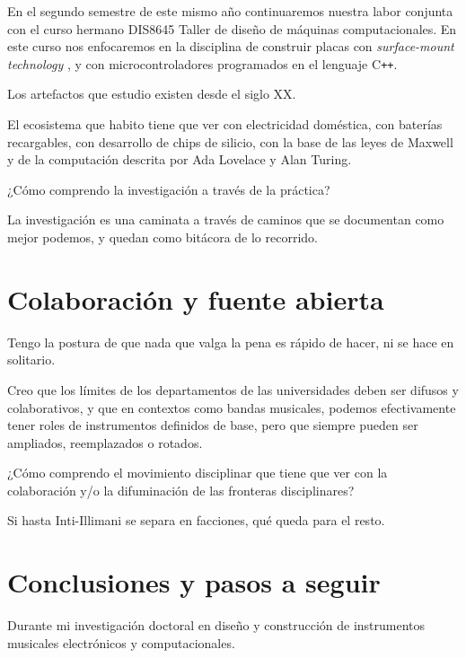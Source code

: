 \documentclass{article}
\begin{document}
En el segundo semestre de este mismo año continuaremos nuestra labor conjunta con el curso hermano DIS8645 Taller de diseño de máquinas computacionales. En este curso nos enfocaremos en la disciplina de construir placas con \textit{surface-mount technology} \cite{smt}, y con microcontroladores programados en el lenguaje C\texttt{++}.

Los artefactos que estudio existen desde el siglo XX.

El ecosistema que habito tiene que ver con electricidad doméstica, con baterías recargables, con desarrollo de chips de silicio, con la base de las leyes de Maxwell y de la computación descrita por Ada Lovelace y Alan Turing.

¿Cómo comprendo la investigación a través de la práctica?

La investigación es una caminata a través de caminos que se documentan como mejor podemos, y quedan como bitácora de lo recorrido.

\clearpage

\section{Colaboración y fuente abierta}

Tengo la postura de que nada que valga la pena es rápido de hacer, ni se hace en solitario.

Creo que los límites de los departamentos de las universidades deben ser difusos y colaborativos, y que en contextos como bandas musicales, podemos efectivamente tener roles de instrumentos definidos de base, pero que siempre pueden ser ampliados, reemplazados o rotados.

¿Cómo comprendo el movimiento disciplinar que tiene que ver con la colaboración y/o la difuminación de las fronteras disciplinares?

Si hasta Inti-Illimani se separa en facciones, qué queda para el resto.

\clearpage

\section{Conclusiones y pasos a seguir}

Durante mi investigación doctoral en diseño y construcción de instrumentos musicales electrónicos y computacionales.

\clearpage

\printbibliography[title={Bibliografía}, heading=bibintoc]
\end{document}
